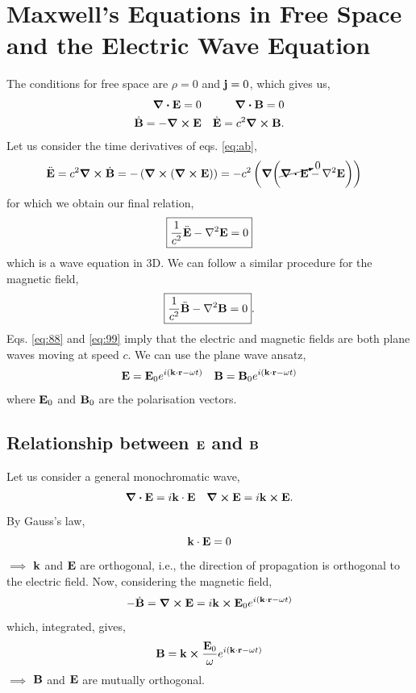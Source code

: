 \documentclass{book}
\begin{document}
\section{Maxwell's Equations in Free Space and the Electric Wave Equation}
The conditions for free space are $\rho =0$ and $\vb{j} = 0$, which gives us,
\begin{align}
	\div{\vb{E}} = 0 && \div{\vb{B}} = 0 \\
	\Dot{\vb{B}} = -\curl{\vb{E}} && \Dot{\vb{E}} = c^2 \curl{\vb{B}} \label{eq:ab}.
\end{align}
Let us consider the time derivatives of eqs. \eqref{eq:ab},
\begin{equation}
	\begin{split}
		\Ddot{\vb{E}} = c^2 \curl{\Dot{\vb{B}}} & = -\left(\curl{(\curl{\vb{E}})}\right) 
		 = -c^2\left(\grad(\cancelto{0}{\div{\vb{E}}} - \laplacian{\vb{E}})\right)
	\end{split}
\end{equation}
for which we obtain our final relation,
\begin{equation}
	\boxed{\frac{1}{c^2}\Ddot{\vb{E}} - \laplacian \vb{E} = 0} \label{eq:88}
\end{equation}
which is a wave equation in 3D. We can follow a similar procedure for the magnetic field,
\begin{equation}
	\boxed{\frac{1}{c^2}\Ddot{\vb{B}} - \laplacian\vb{B} = 0}. \label{eq:99}
\end{equation}
Eqs. \eqref{eq:88} and \eqref{eq:99} imply that the electric and magnetic fields are both plane waves moving at speed $c$. We can use the plane wave ansatz,
\begin{align}
	\vb{E}= \vb{E}_0 e^{i(\vb{k}\cdot\vb{r} - \omega t)} && \vb{B} = \vb{B}_0e^{i(\vb{k}\cdot\vb{r} - \omega t)} \label{eq:plane wave ansatz}
\end{align}
where $\vb{E}_0$ and $\vb{B}_0$ are the polarisation vectors. 
\subsection{Relationship between $\vb{E}$ and $\vb{B}$}
Let us consider a general monochromatic wave,
\begin{align}
	\div{\vb{E}} = i\vb{k}\cdot\vb{E} && \curl{\vb{E}} = i\vb{k}\cross \vb{E}.
\end{align}
By Gauss's law,
\begin{equation}
	\vb{k}\cdot\vb{E} = 0
\end{equation}
$\implies$ $\vb{k}$ and $\vb{E}$ are orthogonal, i.e., the direction of propagation is orthogonal to the electric field. Now, considering the magnetic field,
\begin{equation}
	-\Dot{\vb{B}} = \curl{\vb{E}} = i\vb{k}\cross\vb{E}_0e^{i(\vb{k}\cdot\vb{r} - \omega t)}
\end{equation}
which, integrated, gives,
\begin{equation}
	\vb{B} = \vb{k}\cross \frac{\vb{E}_0}{\omega}e^{i(\vb{k}\cdot{\vb{r}} - \omega t)}
\end{equation}
$\implies$ $\vb{B}$ and $\vb{E}$ are mutually orthogonal.
\end{document}
